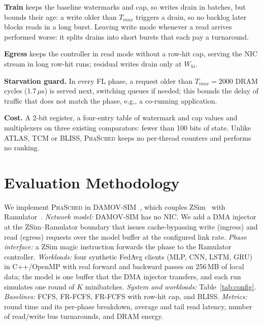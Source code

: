 \documentclass[conference]{IEEEtran}
\newcommand{\name}{\textsc{PhaSched}}
\begin{document}
\textbf{Train} keeps the baseline watermarks and cap, so writes drain in batches, but bounds their age: a write older than $T_{max}$ triggers a drain, so no backlog later blocks reads in a long burst. Leaving write mode whenever a read arrives performed worse: it splits drains into short bursts that each pay a turnaround.

\textbf{Egress} keeps the controller in read mode without a row-hit cap, serving the NIC stream in long row-hit runs; residual writes drain only at $W_{hi}$.

\textbf{Starvation guard.} In every FL phase, a request older than $T_{max}=2000$ DRAM cycles (1.7\,$\mu$s) is served next, switching queues if needed; this bounds the delay of traffic that does not match the phase, e.g., a co-running application.

\textbf{Cost.} A 2-bit register, a four-entry table of watermark and cap values and multiplexers on three existing comparators: fewer than 100 bits of state. Unlike ATLAS, TCM or BLISS, \name{} keeps no per-thread counters and performs no ranking.
\section{Evaluation Methodology}
We implement \name{} in DAMOV-SIM~\cite{damov}, which couples ZSim~\cite{zsim} with Ramulator~\cite{ramulator}. \emph{Network model:} DAMOV-SIM has no NIC. We add a DMA injector at the ZSim--Ramulator boundary that issues cache-bypassing write (ingress) and read (egress) requests over the model buffer at the configured link rate. \emph{Phase interface:} a ZSim magic instruction forwards the phase to the Ramulator controller.  \emph{Workloads:} four synthetic FedAvg clients (MLP, CNN, LSTM, GRU) in C++/OpenMP with real forward and backward passes on 256\,MB of local data; the model is one buffer that the DMA injector transfers, and each run simulates one round of $K$ minibatches.
\emph{System and workloads:} Table~\ref{tab:config}. \emph{Baselines:} FCFS, FR-FCFS, FR-FCFS with row-hit cap, and BLISS. \emph{Metrics:} round time and its per-phase breakdown, average and tail read latency, number of read/write bus turnarounds, and DRAM energy.
\end{document}
